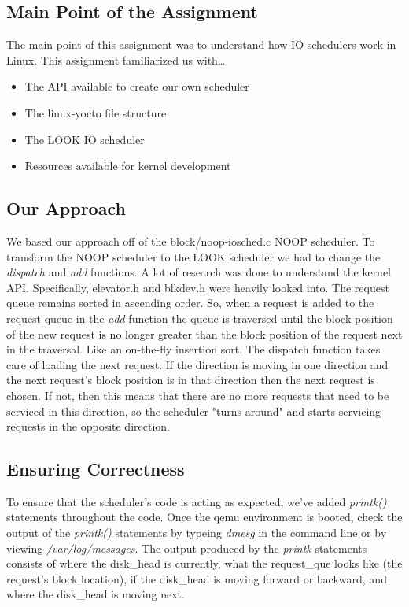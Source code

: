 \documentclass[draftclsnofoot, onecolumn, 10pt, compsoc]{IEEEtran}
\begin{document}
		\subsection{Main Point of the Assignment}
			The main point of this assignment was to understand how IO schedulers work in Linux. 
			This assignment familiarized us with\dots \\
			\begin{itemize}
				\item The API available to create our own scheduler
				\item The linux-yocto file structure
				\item The LOOK IO scheduler
				\item Resources available for kernel development
			\end{itemize}
		\subsection{Our Approach}
			We based our approach off of the block/noop-iosched.c NOOP scheduler.
			To transform the NOOP scheduler to the LOOK scheduler we had to change the \textit{dispatch} and \textit{add} functions.
			A lot of research was done to understand the kernel API.
			Specifically, elevator.h and blkdev.h were heavily looked into.
			The request queue remains sorted in ascending order. 
			So, when a request is added to the request queue in the \textit{add} function the queue is traversed until the block position of the new request is no longer greater than the block position of the request next in the traversal. 
			Like an on-the-fly insertion sort.
			The dispatch function takes care of loading the next request. 
			If the direction is moving in one direction and the next request's block position is in that direction then the next request is chosen.
			If not, then this means that there are no more requests that need to be serviced in this direction, so the scheduler "turns around" and starts servicing requests in the opposite direction.
		\subsection{Ensuring Correctness}
			To ensure that the scheduler's code is acting as expected, we've added \textit{printk()} statements throughout the code.
			Once the qemu environment is booted, check the output of the \textit{printk()} statements by typeing \textit{dmesg} in the command line or by viewing \textit{/var/log/messages}.
			The output produced by the \textit{printk} statements consists of where the disk\_head is currently, what the request\_que looks like (the request's block location), if the disk\_head is moving forward or backward, and where the disk\_head is moving next.
\end{document}
